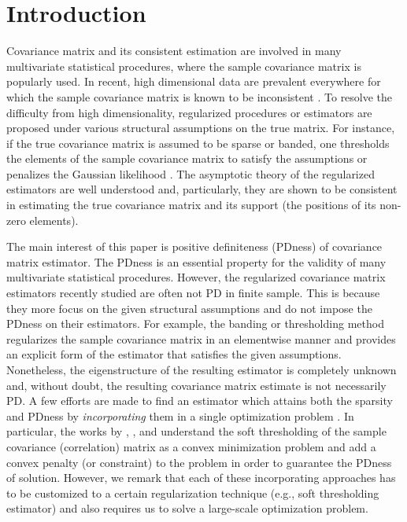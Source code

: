 \documentclass[times,sort&compress,3p]{elsarticle}
\begin{document}
\section{Introduction}\label{sec:introduction}
Covariance matrix and its consistent estimation are involved in many multivariate statistical procedures, where the sample
covariance matrix is popularly used. In recent, high dimensional data are prevalent everywhere for which the sample covariance
matrix is known to be inconsistent \citep{Marcenko1967}. To resolve the difficulty from high dimensionality, 
regularized procedures
or estimators are proposed under various structural assumptions on the true matrix.  For instance, if the true covariance matrix is
assumed to be sparse or banded, one thresholds the elements of the sample covariance matrix to satisfy the assumptions
\citep{Bickel2008a,Bickel2008,Cai2010,Cai2011a,Cai2012c,Cai2012f,Rothman2009}
or penalizes the Gaussian likelihood \citep{Bien2011,Lam2009}. The asymptotic theory of
the regularized estimators are well understood
and, particularly, they are shown to be consistent in estimating the true covariance matrix and its support (the positions of its non-zero elements).

The main interest of this paper is positive definiteness (PDness) of covariance matrix estimator.
The PDness is an essential property for the validity of many multivariate statistical procedures.
However, the regularized covariance matrix estimators recently studied are often not PD in finite sample. This is because they more focus
on the given structural assumptions and do not impose the PDness on their estimators. For example, the banding or
thresholding
 method \citep{Bickel2008,Rothman2009} regularizes the sample covariance matrix in an elementwise manner and provides an
 explicit form of the estimator that satisfies the given assumptions. Nonetheless, 
 the eigenstructure of the resulting estimator is 
 completely unknown 
 and, without doubt, the resulting covariance matrix estimate is not necessarily PD.
 A few efforts are made to find an estimator which attains both the sparsity and PDness 
by \emph{incorporating} them in a single optimization problem \citep{Bien2011,Lam2009,Liu2014,Rothman2012,Xue2012}.
In particular,
 the works by \citet{Rothman2012}, \citet{Xue2012}, and \citet{Liu2014} understand the soft thresholding of the sample
 covariance (correlation) matrix as a convex minimization problem and
add a convex penalty (or constraint) to the problem in order to guarantee the PDness of solution. However, 
we remark that each of these incorporating approaches has to be customized to a certain regularization technique
(e.g., soft thresholding estimator)  and also requires us to solve a large-scale optimization problem.
\end{document}

